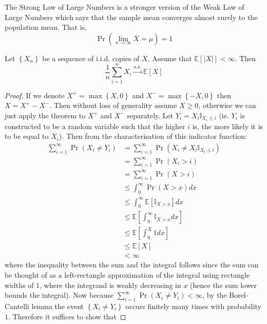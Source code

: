 \documentclass[11pt]{report} %
\begin{document}
The Strong Law of Large Numbers is a stronger version of the Weak Law of Large Numbers which says that the sample mean converges almost surely to the population mean. That is,
\begin{equation}
\operatorname{Pr}\left(\lim_{n\to\infty}\overline{X} = \mu\right) = 1
\end{equation}
\begin{theorem}
Let $\left\{X_{n}\right\}$ be a sequence of i.i.d. copies of $X$. Assume that $\mathbb{E}\left[\left|X\right|\right] < \infty$. Then
\begin{equation}
\dfrac{1}{n}\sum_{i = 1}^{n}X_{i} \overset{\mathrm{a.s.}}{\to} \mathbb{E}\left[X\right]
\end{equation}
\end{theorem}
\begin{proof}
If we denote $X^{+} = \max\left\{X, 0\right\}$ and $X^{-} = \max\left\{-X, 0\right\}$ then $X = X^{+} - X^{-}$. Then without loss of generality assume $X \geq 0$, otherwise we can just apply the theorem to $X^{+}$ and $X^{-}$ separately. Let $Y_{i} = X_{i}\mathbb{I}_{X_{i} \leq i}$ (ie. $Y_{i}$ is constructed to be a random variable such that the higher $i$ is, the more likely it is to be equal to $X_{i}$). Then from the characterisation of this indicator function:
\begin{align}
\sum_{i = 1}^{\infty}\operatorname{Pr}\left(X_{i} \neq Y_{i}\right) &= \sum_{i = 1}^{\infty}\operatorname{Pr}\left(X_{i} \neq X_{i}\mathbb{I}_{X_{i} \leq i}\right)\\
&= \sum_{i = 1}^{\infty}\operatorname{Pr}\left(X_{i} > i\right) \\
&= \sum_{i = 1}^{\infty}\operatorname{Pr}\left(X > i\right) \\
&\leq \int_{0}^{\infty}\operatorname{Pr}\left(X > x\right)dx \\
&\leq \int_{0}^{\infty}\mathbb{E}\left[\mathbb{I}_{X > x}\right]dx \\
&\leq \mathbb{E}\left[\int_{0}^{\infty}\mathbb{I}_{X > x}dx\right] \\
&\leq \mathbb{E}\left[\int_{0}^{X}1dx\right] \\
&\leq \mathbb{E}\left[X\right] \\
&< \infty
\end{align}
where the inequality between the sum and the integral follows since the sum can be thought of as a left-rectangle approximation of the integral using rectangle widths of $1$, where the integrand is weakly decreasing in $x$ (hence the sum lower bounds the integral). Now because $\sum_{i = 1}^{\infty}\operatorname{Pr}\left(X_{i} \neq Y_{i}\right) < \infty$, by the Borel-Cantelli lemma the event $\left\{X_{i} \neq Y_{i}\right\}$ occurs finitely many times with probability $1$. Therefore it suffices to show that

\end{proof}
\end{document}
